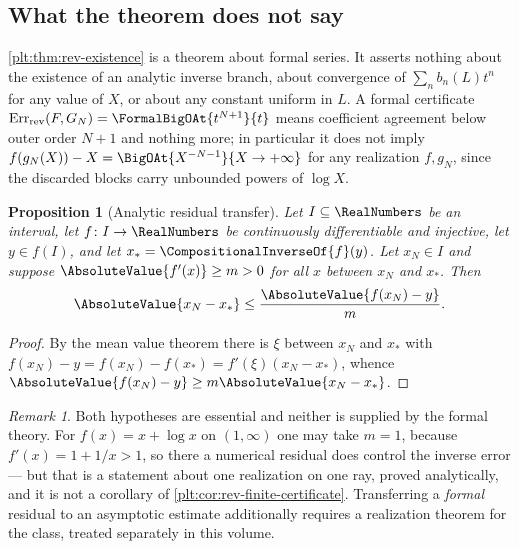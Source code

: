 \documentclass[11pt,oneside]{article}
\theoremstyle{plain}
\newtheorem{proposition}[theorem]{Proposition}
\theoremstyle{definition}
\theoremstyle{remark}
\newtheorem{remark}[theorem]{Remark}
\newcommand{\rev}[1]{\CompositionalInverseOf{#1}}
\newcommand{\RevErr}[2]{\operatorname{Err}_{\mathrm{rev}}\!\left(#1,#2\right)}
\begin{document}
\subsection{What the theorem does not say}
\label{plt:sec:rev-not-analytic}

\begin{warningbox}
\cref{plt:thm:rev-existence} is a theorem about formal series.  It asserts
nothing about the existence of an analytic inverse branch, about convergence of
\(\sum_nb_n(L)t^n\) for any value of \(X\), or about any constant uniform in
\(L\).  A formal certificate \(\RevErr{F}{G_N}=\FormalBigOAt{t^{N+1}}{t}\)
means coefficient agreement below outer order \(N+1\) and nothing more; in
particular it does not imply
\(f(g_N(X))-X=\BigOAt{X^{-N-1}}{X\to+\infty}\) for any realization
\(f,g_N\), since the discarded blocks carry unbounded powers of \(\log X\).
\end{warningbox}

\begin{proposition}[Analytic residual transfer]
\label{plt:prop:rev-analytic-transfer}
Let \(I\subseteq\RealNumbers\) be an interval, let \(f\colon I\to\RealNumbers\)
be continuously differentiable and injective, let \(y\in f(I)\), and let
\(x_*=\rev{f}(y)\).  Let \(x_N\in I\) and suppose
\(\AbsoluteValue{f'(x)}\ge m>0\) for all \(x\) between \(x_N\) and \(x_*\).
Then
\[
 \AbsoluteValue{x_N-x_*}\le\frac{\AbsoluteValue{f(x_N)-y}}{m}.
\]
\end{proposition}

\begin{proof}
By the mean value theorem there is \(\xi\) between \(x_N\) and \(x_*\) with
\(f(x_N)-y=f(x_N)-f(x_*)=f'(\xi)(x_N-x_*)\), whence
\(\AbsoluteValue{f(x_N)-y}\ge m\AbsoluteValue{x_N-x_*}\).
\end{proof}

\begin{remark}
\label{plt:rmk:rev-transfer-hypotheses}
Both hypotheses are essential and neither is supplied by the formal theory.
For \(f(x)=x+\log x\) on \((1,\infty)\) one may take \(m=1\), because
\(f'(x)=1+1/x>1\), so there a numerical residual does control the inverse
error --- but that is a statement about one realization on one ray, proved
analytically, and it is not a corollary of
\cref{plt:cor:rev-finite-certificate}.  Transferring a \emph{formal} residual
to an asymptotic estimate additionally requires a realization theorem for the
class, treated separately in this volume.
\end{remark}
\end{document}
